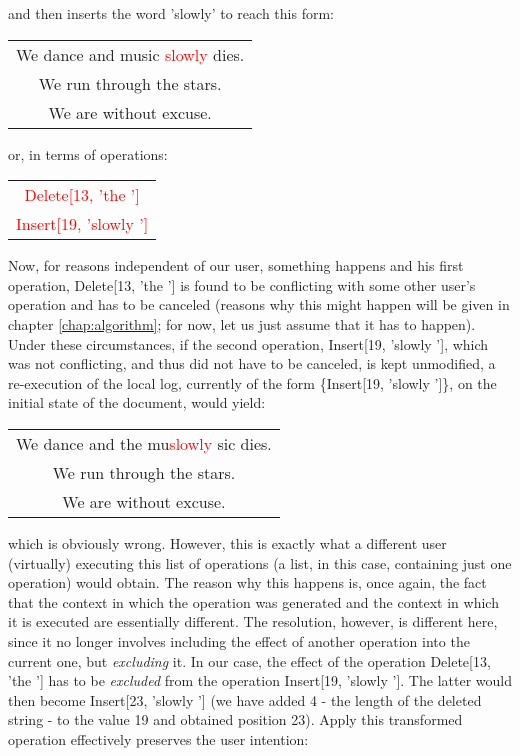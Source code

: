 and then inserts the word 'slowly' to reach this form:

\begin{center}
\begin{tabular}[c]{|c|}
\hline
We dance and music \textcolor{red}{slowly} dies.\\
We run through the stars.\\
We are without excuse.\\
\hline
\end{tabular}
\end{center}

or, in terms of operations:

\begin{center}
\begin{tabular}[c]{|c|}
\hline
\textcolor{red}{Delete[13, 'the ']}\\
\textcolor{red}{Insert[19, 'slowly ']}\\
\hline
\end{tabular}
\end{center}

Now, for reasons independent of our user, something happens and his first operation,
Delete[13, 'the '] is found to be conflicting with some other user's operation and has
to be canceled (reasons why this might happen will be given in chapter \ref{chap:algorithm};
for now, let us just assume that it has to happen). Under these circumstances, if
the second operation, Insert[19, 'slowly '], which was not conflicting, and thus did
not have to be canceled, is kept unmodified, a re-execution of the local log,
currently of the form \{Insert[19, 'slowly ']\}, on the initial state of the document,
would yield:

\begin{center}
\begin{tabular}[c]{|c|}
\hline
We dance and the mu\textcolor{red}{slowly }sic dies.\\
We run through the stars.\\
We are without excuse.\\
\hline
\end{tabular}
\end{center}

which is obviously wrong. However, this is exactly what a different user (virtually)
executing this list of operations (a list, in this case, containing just one operation)
would obtain. The reason why this happens is, once again, the fact that the context
in which the operation was generated and the context in which it is executed are
essentially different. The resolution, however, is different here, since it no
longer involves including the effect of another operation into the current one,
but \emph{excluding} it. In our case, the effect of the operation Delete[13, 'the ']
has to be \emph{excluded} from the operation Insert[19, 'slowly ']. The latter
would then become Insert[23, 'slowly '] (we have added 4 - the length of the deleted
string - to the value 19 and obtained position 23). Apply this transformed operation
effectively preserves the user intention:

